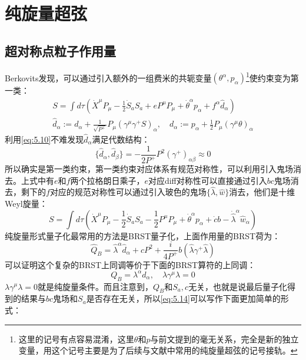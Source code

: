 \section{纯旋量超弦}
\subsection{超对称点粒子作用量}
Berkovits发现，可以通过引入额外的一组费米的共轭变量$(\theta^\alpha,p_\alpha)$\footnote{这里的记号有点容易混淆，这里$\theta$和$p$与前文提到的毫无关系，完全是新的独立变量，用这个记号主要是为了后续与文献中常用的纯旋量超弦的记号接轨。}使约束变为第一类：
\begin{equation}
\begin{gathered}
		S=\int d\tau\left(\dot{X}^\mu P_\mu-\frac{1}{2}\dot{S}_aS_a+eP^\mu P_\mu+\dot{\theta}^\alpha p_\alpha+f^\alpha\hat{d}_\alpha\right)\\
	\hat{d}_\alpha:=d_\alpha+\frac{1}{\sqrt{P^+}}P_\mu(\gamma^\mu\gamma^+S)_\alpha,\quad d_\alpha:=p_\alpha+\frac{1}{2}P_\mu(\gamma^\mu\theta)_\alpha
\end{gathered}
\end{equation}
利用\ref{eq:5.10}不难发现$\hat{d}_\alpha$满足代数结构：
\begin{equation}
	\{\hat{d}_\alpha,\hat{d}_\beta\}=-\frac{1}{2P^+}P^2(\gamma^+)_{\alpha\beta}\approx 0
\end{equation}
所以确实是第一类约束，第一类约束对应体系有规范对称性，可以利用引入鬼场消去。上式中有$e$和$f$两个拉格朗日乘子，$e$对应diff对称性可以直接通过引入$bc$鬼场消去，剩下的$f$对应的规范对称性可以通过引入玻色的鬼场$\{\hat\lambda,\hat w\}$消去，他们是十维Weyl旋量：
\begin{equation}
	\label{eq:5.14}
	S=\int d\tau\left(\dot{X}^\mu P_\mu-\frac{1}{2}\dot{S}_aS_a-\frac{1}{2}P^\mu P_\mu+\dot{\theta}^\alpha p_\alpha+\dot{c}b-\dot{\hat{\lambda}}^\alpha\hat{w}_\alpha\right)
\end{equation}
纯旋量形式量子化最常用的方法是BRST量子化，上面作用量的BRST荷为：
\begin{equation}
	\hat{Q}_B=\hat{\lambda}^\alpha\hat{d}_\alpha+cP^2+\frac{i}{4P^+}b(\hat{\lambda}\gamma^+\hat{\lambda})
\end{equation}
可以证明这个复杂的BRST上同调等价于下面的BRST算符的上同调：
\begin{equation}
	\label{eq:5.16}
	Q_B=\lambda^\alpha d_\alpha, \quad \lambda\gamma^\mu\lambda = 0
\end{equation}
$\lambda\gamma^\mu\lambda = 0$就是纯旋量条件。而且注意到，$Q_B$和$S_a,c$无关，也就是说最后量子化得到的结果与$bc$鬼场和$S_a$是否存在无关，所以\ref{eq:5.14}可以写作下面更加简单的形式：
